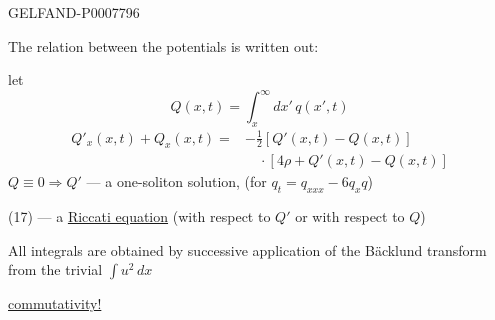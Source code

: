 \begin{GelfandAdjacentEvidence}{GELFAND-P000779}{6}


The relation between the potentials is written out:

let
\begin{equation}
Q(x,t)=\int_x^\infty dx'\,q(x',t)\tag{16}
\end{equation}
\begin{equation}
\begin{split}
Q'_x(x,t)+Q_x(x,t)={}&-\tfrac12[Q'(x,t)-Q(x,t)]\\
&\quad\cdot[4\rho+Q'(x,t)-Q(x,t)]
\end{split}\tag{17}
\end{equation}
\(Q\equiv0\Rightarrow Q'\) --- a one-soliton solution, (for \(q_t=q_{xxx}-6q_xq\))

(17) --- a \underline{Riccati equation} (with respect to \(Q'\) or with respect to \(Q\))

All integrals are obtained by successive application of the Bäcklund transform from the trivial \(\int u^2\,dx\)


\end{GelfandAdjacentEvidence}

\underline{commutativity!}


